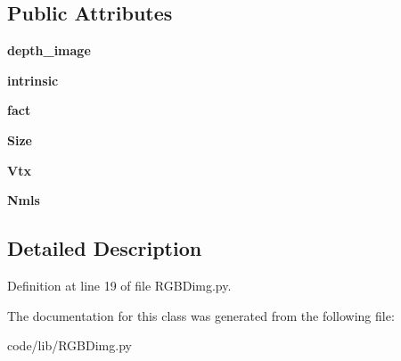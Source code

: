 \subsection*{Public Attributes}
\begin{DoxyCompactItemize}
\item 
\mbox{\label{class_r_g_b_dimg_1_1_r_g_b_d_a8911bb808faf77dae68067898af0bea9}} 
{\bfseries depth\+\_\+image}
\item 
\mbox{\label{class_r_g_b_dimg_1_1_r_g_b_d_a288a90ad53bc3ef5d6b846fdeaf0e0aa}} 
{\bfseries intrinsic}
\item 
\mbox{\label{class_r_g_b_dimg_1_1_r_g_b_d_a6cff3b8f7ed04717a022bcc38d944d07}} 
{\bfseries fact}
\item 
\mbox{\label{class_r_g_b_dimg_1_1_r_g_b_d_a704907314070d5e30b87e4053f684c38}} 
{\bfseries Size}
\item 
\mbox{\label{class_r_g_b_dimg_1_1_r_g_b_d_a94bb6aa853d1c6f473dadd22805d8c63}} 
{\bfseries Vtx}
\item 
\mbox{\label{class_r_g_b_dimg_1_1_r_g_b_d_ac1c05bfa8f8e460e511ce50cbee65ba8}} 
{\bfseries Nmls}
\end{DoxyCompactItemize}


\subsection{Detailed Description}


Definition at line 19 of file R\+G\+B\+Dimg.\+py.



The documentation for this class was generated from the following file\+:\begin{DoxyCompactItemize}
\item 
code/lib/R\+G\+B\+Dimg.\+py\end{DoxyCompactItemize}
